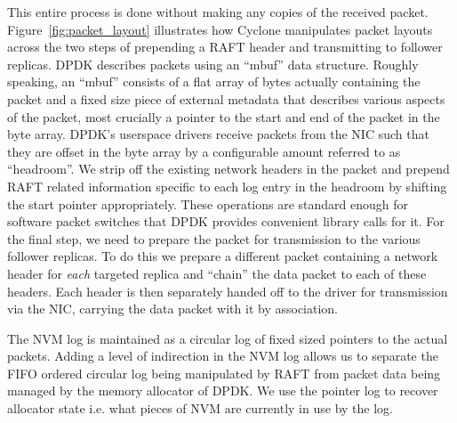 \documentclass[letterpaper,twocolumn,10pt]{article}
\begin{document}
This entire process is done without making any copies of the received packet.
Figure~\ref{fig:packet_layout} illustrates how
Cyclone manipulates packet layouts across the two steps of prepending a RAFT
header and transmitting to follower replicas. DPDK describes packets using an
``mbuf'' data structure. Roughly speaking, an ``mbuf'' consists of a flat array
of bytes actually containing the packet and a fixed size piece of external
metadata that describes various aspects of the packet, most crucially a pointer
to the start and end of the packet in the byte array. DPDK's userspace drivers
receive packets from the NIC such that they are offset in the byte array by a
configurable amount referred to as ``headroom''. We strip off the existing
network headers in the packet and prepend RAFT related information specific to
each log entry in the headroom by shifting the start pointer appropriately.
These operations are standard enough for software packet switches that DPDK
provides convenient library calls for it. For the final step, we need to prepare
the packet for transmission to the various follower replicas. To do this we
prepare a different packet containing a network header for \emph{each}
targeted replica and ``chain'' the data packet to each of these headers. Each
header is then separately handed off to the driver for transmission via the NIC,
carrying the data packet with it by association.

The NVM log is maintained as a circular log of fixed sized pointers to
the actual packets. Adding a level of
indirection in the NVM log allows us to separate the FIFO ordered
circular log being manipulated by RAFT from packet data being managed
by the memory allocator of DPDK. We use the pointer log to recover
allocator state i.e. what pieces of NVM are currently in use by the
log.

\end{document}
